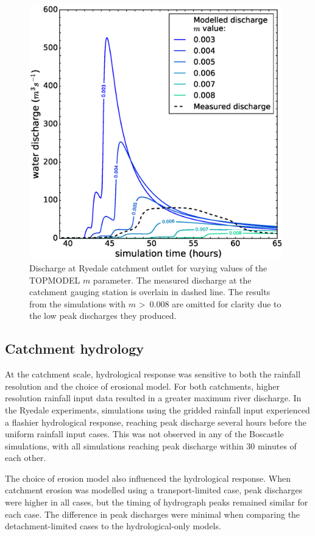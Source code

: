 \begin{figure}[t]
\includegraphics[width=11cm]{chp06_figures_scripts/figure_ryedale_M_sens.eps}
\caption{Discharge at Ryedale catchment outlet for varying values of the TOPMODEL \(m\) parameter. The measured discharge at the catchment gauging station is overlain in dashed line. The results from the simulations with \(m\) \textgreater \ 0.008 are omitted for clarity due to the low peak discharges they produced.}
\label{fig_topmodel_m_ryedale}
\end{figure}

\subsection{Catchment hydrology}


At the catchment scale, hydrological response was sensitive to both the rainfall resolution and the choice of erosional model. For both catchments, higher resolution rainfall input data resulted in a greater maximum river discharge. In the Ryedale experiments, simulations using the gridded rainfall input experienced a flashier hydrological response, reaching peak discharge several hours before the uniform rainfall input cases. This was not observed in any of the Boscastle simulations, with all simulations reaching peak discharge within 30 minutes of each other.

The choice of erosion model also influenced the hydrological response. When catchment erosion was modelled using a transport-limited case, peak discharges were higher in all cases, but the timing of hydrograph peaks remained similar for each case. The difference in peak discharges were minimal when comparing the detachment-limited cases to the hydrological-only models.

